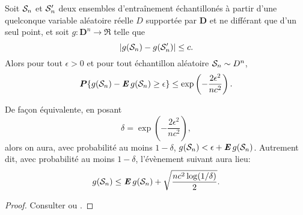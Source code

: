 \begin{lemme}
  \label{lem:mcdiarmid}
  Soit $\S_n$ et $\S_n'$ deux ensembles d'entraînement échantillonés à partir d'une
  quelconque variable aléatoire réelle $D$ supportée par $\bm D$ et ne
  différant que d'un seul point, et soit $g:{\bm D}^n\to\Re$ telle que
  \begin{equation}
    |g(\S_n) - g(\S_n')| \leq c.
  \end{equation}
  Alors pour tout $\epsilon>0$ et pour tout échantillon aléatoire $\S_n \sim D^n$,
  \begin{equation}
    \pp\{g(\S_n) - \E g(\S_n) \geq \epsilon\} \leq \exp\left(-\frac{2\epsilon^2}{nc^2}\right).
  \end{equation}
\end{lemme}

\begin{rem}
  De façon équivalente, en posant
  \begin{equation}
    \delta = \exp\left(-\frac{2\epsilon^2}{nc^2}\right),
  \end{equation}
  alors on aura, avec probabilité au moins $1-\delta$, $g(\S_n) < \epsilon + \E g(\S_n)$. Autrement
  dit, avec probabilité au moins $1-\delta$, l'évènement suivant aura lieu:
  \begin{equation}
    g(\S_n) \leq \E g(\S_n) + \sqrt{\frac{nc^2\log(1/\delta)}{2}}.
  \end{equation}
\end{rem}

\begin{proof}
  Consulter \cite{mohri2012foundations} ou \cite{boucheron2013concentration}.
\end{proof}


